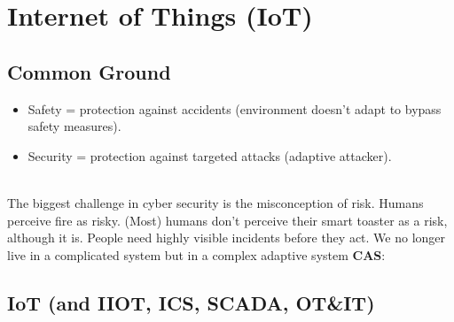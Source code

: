 \section{Internet of Things (IoT)}
\label{iot}

\subsection{Common Ground}

\begin{itemize}
    \item Safety = protection against accidents (environment doesn't adapt to bypass safety measures).
    \item Security = protection against targeted attacks (adaptive attacker).
\end{itemize}
\\
The biggest challenge in cyber security is the misconception of risk. Humans perceive fire as risky. (Most) humans don't perceive their smart toaster as a risk, although it is. People need highly visible incidents before they act. We no longer live in a complicated system but in a complex adaptive system \textbf{CAS}:

\subsection{IoT (and IIOT, ICS, SCADA, OT\&IT)}

